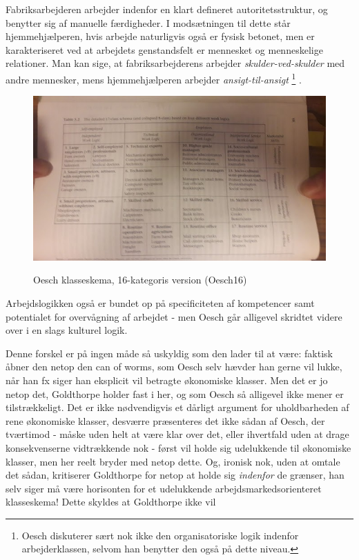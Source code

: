 Fabriksarbejderen arbejder indenfor en klart defineret autoritetsstruktur, og benytter sig af manuelle færdigheder. I modsætningen til dette står hjemmehjælperen, hvis arbejde naturligvis også er fysisk betonet, men er karakteriseret ved at arbejdets genstandsfelt er mennesket og menneskelige relationer. Man kan sige, at fabriksarbejderens arbejder \emph{skulder-ved-skulder} med andre mennesker, mens hjemmehjælperen arbejder \emph{ansigt-til-ansigt}%
%
\footnote{ Oesch diskuterer sært nok ikke den organisatoriske logik indenfor arbejderklassen, selvom han benytter den også på dette niveau.}%
%
. 

%
   \begin{figure}[H]
   \begin{centering}
   	\caption{Oesch klasseskema, 16-kategoris version (Oesch16)}
   	\includegraphics[width=\textwidth]{fig/oesch16_klasseskema.jpg}
   	\label{fig oesch16}
   \end{centering}
   \end{figure}   
%


Arbejdslogikken også er bundet op på specificiteten af kompetencer samt potentialet for overvågning af arbejdet - men Oesch går alligevel skridtet videre over i en slags kulturel logik. 


Denne forskel er på ingen måde så uskyldig som den lader til at være: faktisk åbner den netop den can of worms, som Oesch selv hævder han gerne vil lukke, når han fx siger han eksplicit vil betragte økonomiske klasser. Men det er jo netop det, Goldthorpe holder fast i her, og som Oesch så alligevel ikke mener er tilstrækkeligt. Det er ikke nødvendigvis et dårligt argument for uholdbarheden af rene økonomiske klasser, desværre præsenteres det ikke sådan af Oesch, der tværtimod - måske uden helt at være klar over det, eller ihvertfald uden at drage konsekvenserne vidtrækkende nok - først vil holde sig udelukkende til økonomiske klasser, men her reelt bryder med netop dette. Og, ironisk nok, uden at omtale det sådan, kritiserer Goldthorpe for netop at holde sig \emph{indenfor} de grænser, han selv siger må være horisonten for et udelukkende arbejdsmarkedsorienteret klasseskema! Dette skyldes at Goldthorpe ikke vil 



